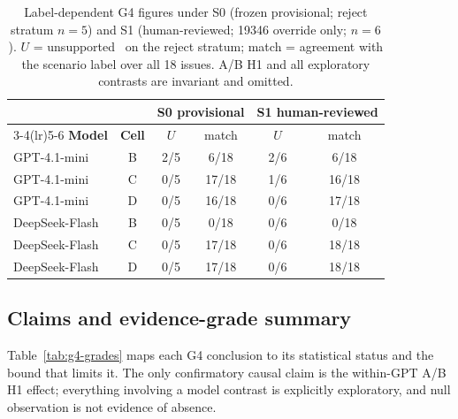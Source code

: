 \begin{table}[t]
\centering\small
\setlength{\tabcolsep}{5pt}
\caption{Label-dependent G4 figures under S0 (frozen provisional; reject
stratum $n=5$) and S1 (human-reviewed; 19346 override only; $n=6$).
$U$ = unsupported \ACCEPT\ on the reject stratum; match = agreement with
the scenario label over all 18 issues. A/B H1 and all exploratory
contrasts are invariant and omitted.}
\label{tab:g4-human}
\begin{tabular}{l c cc cc}
\toprule
 &  & \multicolumn{2}{c}{\textbf{S0 provisional}} & \multicolumn{2}{c}{\textbf{S1 human-reviewed}} \\
\cmidrule(lr){3-4}\cmidrule(lr){5-6}
\textbf{Model} & \textbf{Cell} & $U$ & match & $U$ & match \\
\midrule
GPT-4.1-mini  & B & 2/5 & 6/18  & 2/6 & 6/18  \\
GPT-4.1-mini  & C & 0/5 & 17/18 & 1/6 & 16/18 \\
GPT-4.1-mini  & D & 0/5 & 16/18 & 0/6 & 17/18 \\
DeepSeek-Flash & B & 0/5 & 0/18  & 0/6 & 0/18  \\
DeepSeek-Flash & C & 0/5 & 17/18 & 0/6 & 18/18 \\
DeepSeek-Flash & D & 0/5 & 17/18 & 0/6 & 18/18 \\
\bottomrule
\end{tabular}
\end{table}

\subsection{Claims and evidence-grade summary}
\label{sec:g4-grades}
Table~\ref{tab:g4-grades} maps each G4 conclusion to its statistical status
and the bound that limits it. The only confirmatory causal claim is the
within-GPT A/B H1 effect; everything involving a model contrast is
explicitly exploratory, and null observation is not evidence of absence.

